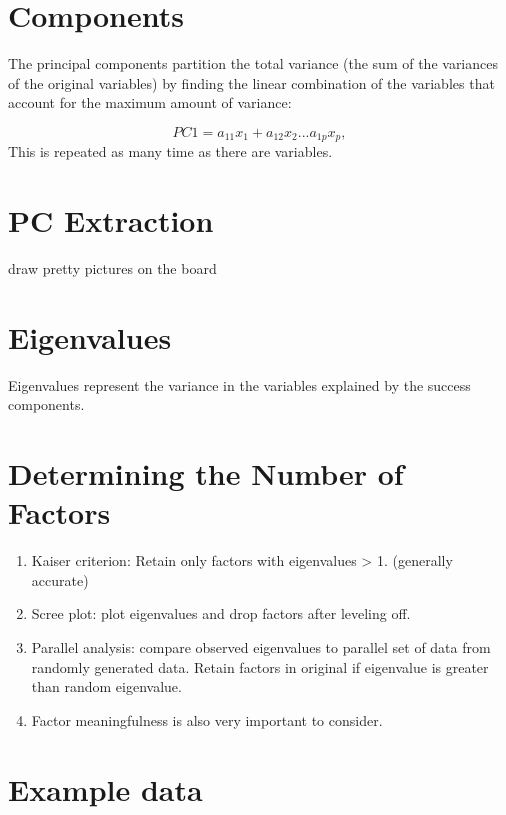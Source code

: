 \documentclass[
]{book}
\providecommand{\tightlist}{%
  \setlength{\itemsep}{0pt}\setlength{\parskip}{0pt}}
\begin{document}
\hypertarget{components}{%
\section{Components}\label{components}}

The principal components partition the total variance (the sum of the variances of the original variables) by finding the linear combination of the variables that account for the maximum amount of variance:

\[
PC1 = a_{11}x_1 + a_{12}x_2 ... a_{1p}x_p, 
\]
This is repeated as many time as there are variables.

\hypertarget{pc-extraction}{%
\section{PC Extraction}\label{pc-extraction}}

draw pretty pictures on the board

\hypertarget{eigenvalues}{%
\section{Eigenvalues}\label{eigenvalues}}

Eigenvalues represent the variance in the variables explained by the success components.

\hypertarget{determining-the-number-of-factors}{%
\section{Determining the Number of Factors}\label{determining-the-number-of-factors}}

\begin{enumerate}
\def\labelenumi{\arabic{enumi}.}
\tightlist
\item
  Kaiser criterion: Retain only factors with eigenvalues \textgreater{} 1. (generally accurate)
\item
  Scree plot: plot eigenvalues and drop factors after leveling off.
\item
  Parallel analysis: compare observed eigenvalues to parallel set of data from randomly generated data. Retain factors in original if eigenvalue is greater than random eigenvalue.
\item
  Factor meaningfulness is also very important to consider.
\end{enumerate}

\hypertarget{example-data}{%
\section{Example data}\label{example-data}}
\end{document}
